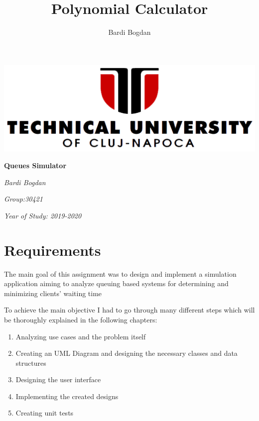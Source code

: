\documentclass[10pt,a4paper]{article}
\author{Bardi Bogdan}
\title{Polynomial Calculator}
\begin{document}
\begin{titlepage}
\centering
\includegraphics[width=0.5\paperwidth]{utcn.png}\par\vspace{5cm}
	{\huge\bfseries Queues Simulator\par}
	\vspace{2cm}
	{\Large\itshape Bardi Bogdan\par}
	{\Large\itshape Group:30421\par}
	{\Large\itshape Year of Study: 2019-2020\par}
	\vfill
\end{titlepage}
\tableofcontents
\pagebreak
\section{Requirements}
The main goal of this assignment was to design and implement a simulation application aiming to analyze queuing based systems for
determining and minimizing clients’ waiting time\par
To achieve the main objective I had to go through many different steps which will be thoroughly explained in the following chapters:
\begin{enumerate}
\item Analyzing use cases and the problem itself
\item Creating an UML Diagram and designing the necessary classes and data structures
\item Designing the user interface
\item Implementing the created designs
\item Creating unit tests
\end{enumerate}
\end{document}
